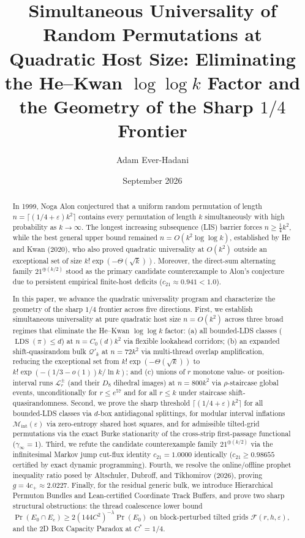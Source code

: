\documentclass[
  11pt,
]{article}
\title{Simultaneous Universality of Random Permutations at Quadratic
Host Size: Eliminating the He--Kwan \(\log\log k\) Factor and the
Geometry of the Sharp \(1/4\) Frontier}
\author{Adam Ever-Hadani}
\date{September 2026}
\begin{document}
\maketitle
\begin{abstract}
In 1999, Noga Alon conjectured that a uniform random permutation of length $n = \lceil(1/4 + \varepsilon)k^2\rceil$ contains every permutation of length $k$ simultaneously with high probability as $k \to \infty$. The longest increasing subsequence (LIS) barrier forces $n \ge \frac{1}{4}k^2$, while the best general upper bound remained $n = O(k^2 \log \log k)$, established by He and Kwan (2020), who also proved quadratic universality at $O(k^2)$ outside an exceptional set of size $k! \exp(-\Theta(\sqrt{k}))$. Moreover, the direct-sum alternating family $21^{\oplus (k/2)}$ stood as the primary candidate counterexample to Alon's conjecture due to persistent empirical finite-host deficits ($c_{21} \approx 0.941 < 1.0$).

In this paper, we advance the quadratic universality program and characterize the geometry of the sharp $1/4$ frontier across five directions. First, we establish simultaneous universality at pure quadratic host size $n = O(k^2)$ across three broad regimes that eliminate the He--Kwan $\log \log k$ factor: (a) all bounded-LDS classes ($\operatorname{LDS}(\pi) \le d$) at $n = C_0(d)k^2$ via flexible lookahead corridors; (b) an expanded shift-quasirandom bulk $\mathcal{Q}'_k$ at $n = 72 k^2$ via multi-thread overlap amplification, reducing the exceptional set from $k! \exp(-\Theta(\sqrt{k}))$ to $k! \exp(-(1/3 - o(1))k / \ln k)$; and (c) unions of $r$ monotone value- or position-interval runs $\mathcal{L}^\pm_r$ (and their $D_8$ dihedral images) at $n = 800 k^2$ via $\rho$-staircase global events, unconditionally for $r \le e^{57}$ and for all $r \le k$ under staircase shift-quasirandomness. Second, we prove the sharp threshold $\lceil(1/4+\varepsilon)k^2\rceil$ for all bounded-LDS classes via $d$-box antidiagonal splittings, for modular interval inflations $\mathcal{M}_{\mathrm{int}}(\varepsilon)$ via zero-entropy shared host squares, and for admissible tilted-grid permutations via the exact Burke stationarity of the cross-strip first-passage functional ($\gamma_\infty = 1$). Third, we refute the candidate counterexample family $21^{\oplus (k/2)}$ via the infinitesimal Markov jump cut-flux identity $c_{21} = 1.0000$ identically ($c_{21} \ge 0.98655$ certified by exact dynamic programming). Fourth, we resolve the online/offline prophet inequality ratio posed by Altschuler, Dubroff, and Tikhomirov (2026), proving $g = 4 c_+ \approx 2.0227$. Finally, for the residual generic bulk, we introduce Hierarchical Permuton Bundles and Lean-certified Coordinate Track Buffers, and prove two sharp structural obstructions: the thread coalescence lower bound $\Pr(E_0 \cap E_e) \ge 2(144 C^2)^{-\lambda}\Pr(E_0)$ on block-perturbed tilted grids $\mathcal{F}(r, h, \varepsilon)$, and the 2D Box Capacity Paradox at $C^* = 1/4$.
\end{abstract}
\end{document}

